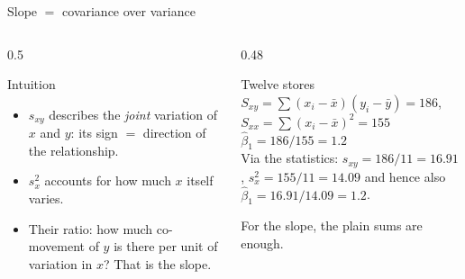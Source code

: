 \documentclass[aspectratio=169,11pt]{beamer}
\newcommand{\minlineskip}{%
  \setlength{\lineskiplimit}{2pt}\setlength{\lineskip}{2pt}%
  \setlength{\normallineskiplimit}{2pt}\setlength{\normallineskip}{2pt}}
\begin{document}
\begin{frame}{Slope $=$ covariance over variance}

  \begin{columns}[T]
    \begin{column}{0.5\textwidth}
      \begin{block}{Intuition}
        \begin{itemize}
          \item $s_{xy}$ describes the \emph{joint} variation of $x$ and $y$:
                its sign $=$ direction of the relationship.
          \item $s_x^{2}$ accounts for how much $x$ itself varies.
          \item Their ratio: how much co-movement of $y$ is there per unit of
                variation in $x$? That is the slope.
        \end{itemize}
      \end{block}
    \end{column}
    \begin{column}{0.48\textwidth}
      \minlineskip
      \begin{exampleblock}{Twelve stores}
        $S_{xy} = \sum (x_i-\bar{x})(y_i-\bar{y}) = 186$, \quad
        $S_{xx} = \sum (x_i-\bar{x})^{2} = 155$ \\[3pt]
        $\hat{\beta}_1 = 186/155 = 1.2$ \\[3pt]
        Via the statistics: $s_{xy} = 186/11 = 16.91$,
        $s_x^{2} = 155/11 = 14.09$ and hence also
        $\hat{\beta}_1 = 16.91/14.09 = 1.2$.
      \end{exampleblock}
      \footnotesize For the slope, the plain sums are enough.
    \end{column}
  \end{columns}
\end{frame}
\end{document}
